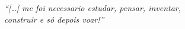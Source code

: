\begin{epigrafe}
    \vspace*{\fill}
	\begin{flushright}
		\textit{``[\ldots] me foi necessario estudar, pensar, inventar,\\
		construir e só depois voar!''}\\
		\cite[p.~96]{santosdumont1918}
	\end{flushright}
\end{epigrafe}
